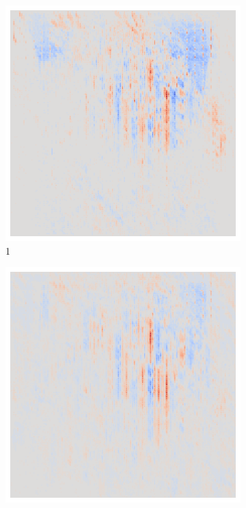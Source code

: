 \begin{figure}[ht!]
\begin{subfigure}{0.095\linewidth}
        \includegraphics[height=1\linewidth]{01-images/05-resultate/uap_efficientnet/uap0-efficientnetv2m-mri-n200-robustificationslevel1.png}
        \caption{1}
    \end{subfigure}\hfill%
    \begin{subfigure}{0.095\linewidth}
        \centering
        \includegraphics[height=1\linewidth]{01-images/05-resultate/uap_efficientnet/uap0-efficientnetv2m-mri-n200-robustificationslevel2.png}

\end{subfigure}
\end{figure}
